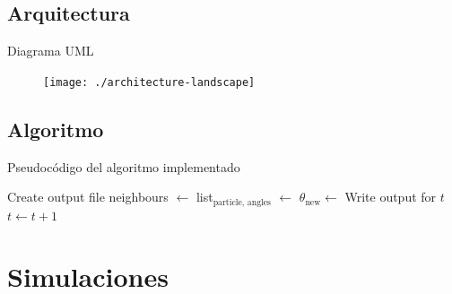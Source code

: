 \documentclass{beamer}
\begin{document}
        \subsection{Arquitectura}

            \begin{frame}{Diagrama UML}
                \begin{figure}[htbp]
                    \centering
                    \texttt{[image: ./architecture-landscape]}
                    \label{fig:architecture}
                \end{figure}
            \end{frame}

        \subsection{Algoritmo}

            \begin{frame}{Pseudocódigo del algoritmo implementado}{}
                    \begin{algorithmic}[1]
                        \ttfamily \footnotesize
                        \State Create output file
                            \State neighbours $\gets$ 
                            \State list$_{\text{particle, angles}}$ $\gets$ 
                                \State $\theta_{\text{new}} \gets$ 
                                \State {}
                                \State {}
                                \State {}
                                \State Write output for $t$
                            \EndFor
                            \State $t \gets t + 1$
                        \EndWhile
                    \end{algorithmic}
            \end{frame}

    \section{Simulaciones}
\end{document}

